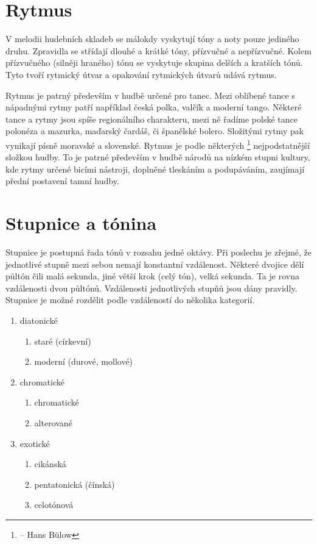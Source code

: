 \section{Rytmus}
V melodii hudebních skladeb se málokdy vyskytují tóny a noty pouze jediného druhu.
Zpravidla se střídají dlouhé a krátké tóny, přízvučné a nepřízvučné.
Kolem přízvučného (silněji hraného) tónu se vyskytuje skupina delších a kratších tónů.
Tyto tvoří rytmický útvar a opakování rytmických útvarů udává rytmus.

\par
Rytmus je patrný především v hudbě určené pro tanec.
Mezi oblíbené tance s nápadnými rytmy patří například česká polka,
valčík a moderní tango. 
Některé tance a rytmy jsou spíše regionálního charakteru, 
mezi ně řadíme polské tance polonéza a mazurka, maďarský čardáš, či španělské bolero.
Složitými rytmy pak vynikají písně moravské a slovenské.
Rytmus je podle některých
\footnote{ -- Hans Bülow} 
nejpodstatnější složkou hudby.
To je patrné především v hudbě národů na nízkém stupni kultury,
kde rytmy určené bicími nástroji, doplněné tleskáním a podupáváním,
zaujímají přední postavení tamní hudby.
\cite{cmiral}

\section{Stupnice a tónina}
\label{stupnice}

Stupnice je postupná řada tónů v rozsahu jedné oktávy.
Při poslechu je zřejmé, že jednotlivé stupně mezi sebou nemají konstantní vzdálenost.
\cite{kofron}
Některé dvojice dělí půltón čili malá sekunda, 
jiné větší krok (celý tón), velká sekunda.
Ta je rovna vzdálenosti dvou půltónů.
Vzdálenosti jednotlivých stupňů jsou dány pravidly.
\cite{cmiral}
Stupnice je možné rozdělit podle vzdáleností do několika kategorií.

\begin{enumerate}
	\item diatonické
	\begin{enumerate}
        \item staré (církevní)
        \item moderní (durové, mollové)
    \end{enumerate}
	\item chromatické
	\begin{enumerate}
        \item chromatické
        \item alterované
    \end{enumerate}
	\item exotické
	\begin{enumerate}
        \item cikánská
        \item pentatonická (čínská)
        \item celotónová
    \end{enumerate}
\end{enumerate}

